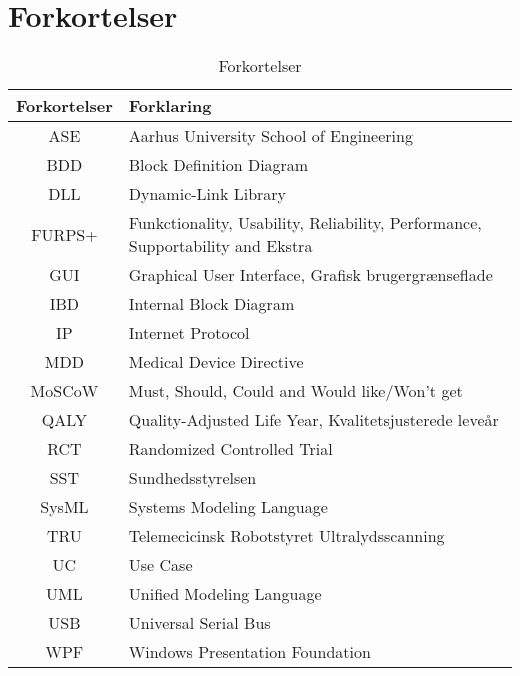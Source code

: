 \chapter{Forkortelser}

\begin{table}[htb]
\centering
\begin{tabular}{ | c | p{} | }
\hline
\textbf{Forkortelser} & \textbf{Forklaring} \\\hline
ASE & Aarhus University School of Engineering \\\hline
BDD & Block Definition Diagram \\\hline
DLL & Dynamic-Link Library \\\hline
FURPS+ & Funkctionality, Usability, Reliability, Performance, Supportability and Ekstra \\\hline
GUI & Graphical User Interface, Grafisk brugergrænseflade \\\hline
IBD & Internal Block Diagram \\\hline
IP & Internet Protocol \\\hline
MDD & Medical Device Directive \\\hline
MoSCoW & Must, Should, Could and Would like/Won't get\\\hline
QALY & Quality-Adjusted Life Year, Kvalitetsjusterede leveår  \\\hline
RCT & Randomized Controlled Trial \\\hline
SST & Sundhedsstyrelsen \\\hline
SysML & Systems Modeling Language \\\hline
TRU & Telemecicinsk Robotstyret Ultralydsscanning \\\hline
UC & Use Case \\\hline
UML & Unified Modeling Language \\\hline
USB & Universal Serial Bus \\\hline
WPF & Windows Presentation Foundation \\\hline

\end{tabular}
\caption{Forkortelser}
\end{table}

\vspace{3cm}